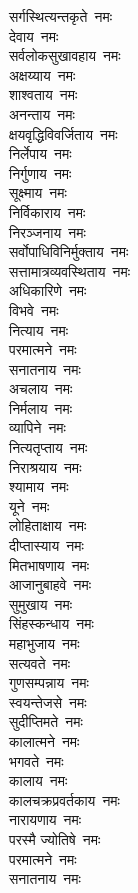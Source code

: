 \begin{multicols}{2}
\begin{flushleft}
सर्गस्थित्यन्तकृते~नमः\\
देवाय~नमः\\
सर्वलोकसुखावहाय~नमः\\
अक्षय्याय~नमः\\
शाश्वताय~नमः\\
अनन्ताय~नमः\\
क्षयवृद्धिविवर्जिताय~नमः\\
निर्लेपाय~नमः\\
निर्गुणाय~नमः\hfill{}\\
सूक्ष्माय~नमः\\
निर्विकाराय~नमः\\
निरञ्जनाय~नमः\\
सर्वोपाधिविनिर्मुक्ताय~नमः\\
सत्तामात्रव्यवस्थिताय~नमः\\
अधिकारिणे~नमः\\
विभवे~नमः\\
नित्याय~नमः\\
परमात्मने~नमः\\
सनातनाय~नमः\hfill{}\\
अचलाय~नमः\\
निर्मलाय~नमः\\
व्यापिने~नमः\\
नित्यतृप्ताय~नमः\\
निराश्रयाय~नमः\\
श्यामाय~नमः\\
यूने~नमः\\
लोहिताक्षाय~नमः\\
दीप्तास्याय~नमः\\
मितभाषणाय~नमः\hfill{}\\
आजानुबाहवे~नमः\\
सुमुखाय~नमः\\
सिंहस्कन्धाय~नमः\\
महाभुजाय~नमः\\
सत्यवते~नमः\\
गुणसम्पन्नाय~नमः\\
स्वयन्तेजसे~नमः\\
सुदीप्तिमते~नमः\\
कालात्मने~नमः\\
भगवते~नमः\hfill{}\\
कालाय~नमः\\
कालचक्रप्रवर्तकाय~नमः\\
नारायणाय~नमः\\
परस्मै ज्योतिषे~नमः\\
परमात्मने~नमः\\
सनातनाय~नमः\\

\end{flushleft}
\end{multicols}
